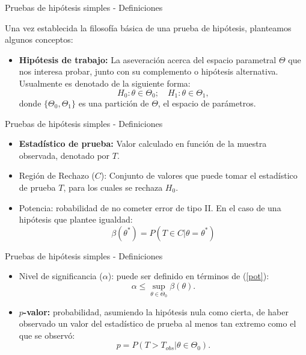 \begin{frame}{Pruebas de hipótesis simples - Definiciones}
    
    Una vez establecida la filosofía básica de una prueba de hipótesis, planteamos algunos conceptos:
    \begin{df}
    \begin{itemize}
        \item \textbf{Hipótesis de trabajo:} La aseveración acerca del espacio parametral $\Theta$ que nos interesa probar,
        junto con su complemento o hipótesis alternativa. Usualmente es denotado de la siguiente forma:
        $$H_0:\theta\in\Theta_0; \quad H_1: \theta\in\Theta_1,$$
        donde $\{\Theta_0,\Theta_1\}$ es una partición de $\Theta$, el espacio de parámetros.
    \end{itemize}
    \end{df}
\end{frame}

\begin{frame}{Pruebas de hipótesis simples - Definiciones}
    \begin{df}[Continuación]
    \begin{itemize}
        \item \textbf{Estadístico de prueba:} Valor calculado en función de la muestra observada, denotado por $T$.
        \item {Región de Rechazo ($C$): } Conjunto de valores que puede tomar el estadístico de prueba $T$, para los cuales se rechaza $H_0$.
        \item {Potencia: } robabilidad de no cometer error de tipo II. En el caso de una hipótesis que plantee igualdad:
        \begin{equation}
        	\beta(\theta^*)=P(T\in C|\theta=\theta^*)\label{pot}
        \end{equation}
    \end{itemize}
    \end{df}
\end{frame}

\begin{frame}{Pruebas de hipótesis simples - Definiciones}
    \begin{df}[Continuación]
    \begin{itemize}
        \item Nivel de significancia ($\alpha$): puede ser definido en términos de (\ref{pot}):
        \begin{equation}
        	\alpha\leq\sup_{\theta\in\Theta_0} \beta(\theta).
        \end{equation}
        \item \textbf{$p$-valor: } probabilidad, asumiendo la hipótesis nula como cierta, de haber observado un valor del estadístico de prueba al menos tan extremo como el que se observó:
        \begin{equation*}
        	p=P(T>T_{obs}|\theta\in\Theta_0).
        \end{equation*}
    \end{itemize}
    \end{df}
\end{frame}

